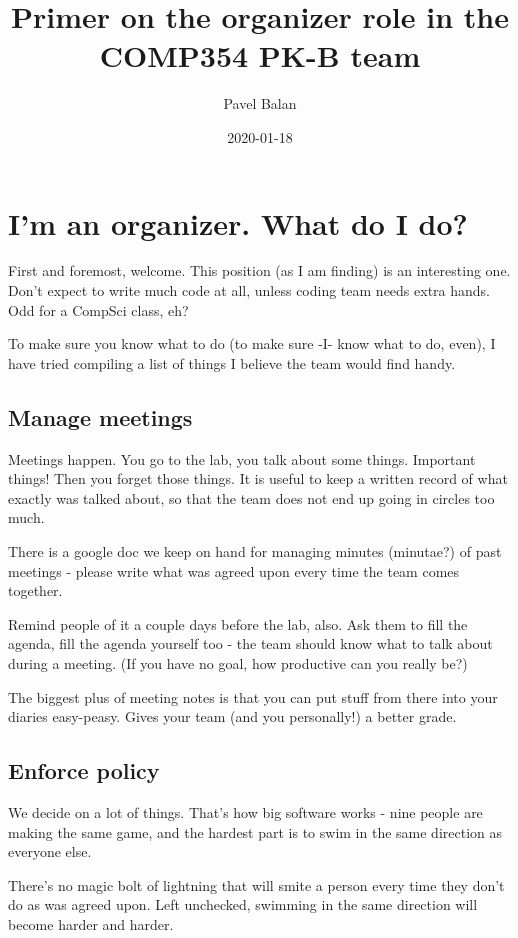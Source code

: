 \documentclass{article}
\title{Primer on the organizer role in the COMP354 PK-B team}
\date{2020-01-18}
\author{Pavel Balan}
\begin{document}
\maketitle
{}
\newpage

\section{I'm an organizer. What do I do?}


First and foremost, welcome. This position (as I am finding) is an interesting one. Don't expect to write much code at all, unless coding team needs extra hands. Odd for a CompSci class, eh?


To make sure you know what to do (to make sure -I- know what to do, even), I have tried compiling a list of things I believe the team would find handy.


\subsection{Manage meetings}


Meetings happen. You go to the lab, you talk about some things. Important things! Then you forget those things. It is useful to keep a written record of what exactly was talked about, so that the team does not end up going in circles too much.


There is a google doc we keep on hand for managing minutes (minutae?) of past meetings - please write what was agreed upon every time the team comes together.


Remind people of it a couple days before the lab, also. Ask them to fill the agenda, fill the agenda yourself too - the team should know what to talk about during a meeting. (If you have no goal, how productive can you really be?)


The biggest plus of meeting notes is that you can put stuff from there into your diaries easy-peasy. Gives your team (and you personally!) a better grade.


\subsection{Enforce policy}


We decide on a lot of things. That's how big software works - nine people are making the same game, and the hardest part is to swim in the same direction as everyone else.


There's no magic bolt of lightning that will smite a person every time they don't do as was agreed upon. Left unchecked, swimming in the same direction will become harder and harder.
\end{document}
